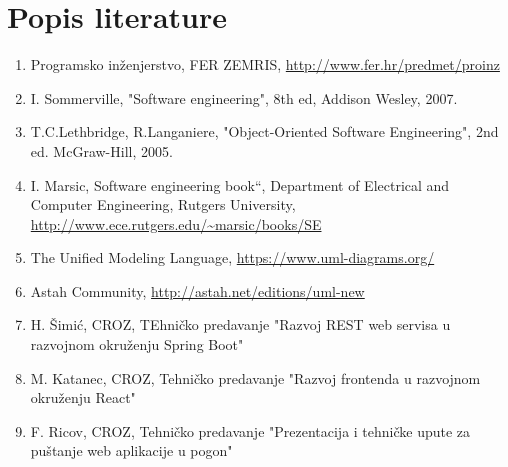 \chapter*{Popis literature}
		
		\begin{enumerate}
			
			
			\item  Programsko inženjerstvo, FER ZEMRIS, \url{http://www.fer.hr/predmet/proinz}
			
			\item  I. Sommerville, "Software engineering", 8th ed, Addison Wesley, 2007.
			
			\item  T.C.Lethbridge, R.Langaniere, "Object-Oriented Software Engineering", 2nd ed. McGraw-Hill, 2005.
			
			\item  I. Marsic, Software engineering book``, Department of Electrical and Computer Engineering, Rutgers University, \url{http://www.ece.rutgers.edu/~marsic/books/SE}
			
			\item  The Unified Modeling Language, \url{https://www.uml-diagrams.org/}
			
			\item  Astah Community, \url{http://astah.net/editions/uml-new}
			
			\item H. Šimić, CROZ, TEhničko predavanje "Razvoj REST web servisa u razvojnom okruženju Spring Boot"
			
			\item M. Katanec, CROZ, Tehničko predavanje "Razvoj frontenda u razvojnom okruženju React"
			
			\item F. Ricov, CROZ, Tehničko predavanje "Prezentacija i tehničke upute za puštanje web aplikacije u pogon"
		\end{enumerate}
		
		 